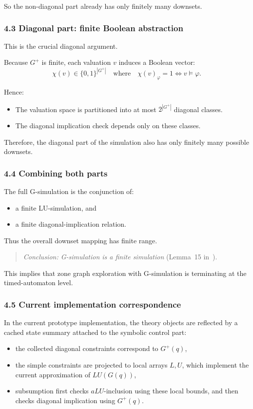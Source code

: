 \documentclass{article}
\begin{document}
So the non-diagonal part already has only finitely many downsets.

\subsubsection*{4.3 Diagonal part: finite Boolean abstraction}

This is the crucial diagonal argument.

Because $G^+$ is finite, each valuation $v$ induces a Boolean vector:
\[
\chi(v) \in \{0,1\}^{|G^+|}
\quad\text{where}\quad
\chi(v)_\varphi = 1 \iff v\models\varphi.
\]

Hence:
\begin{itemize}
  \item The valuation space is partitioned into at most
        $2^{|G^+|}$ diagonal classes.
  \item The diagonal implication check depends only on these classes.
\end{itemize}

Therefore, the diagonal part of the simulation also has
only finitely many possible downsets.

\subsubsection*{4.4 Combining both parts}

The full G-simulation is the conjunction of:
\begin{itemize}
  \item a finite LU-simulation, and
  \item a finite diagonal-implication relation.
\end{itemize}

Thus the overall downset mapping has finite range.

\begin{quote}
\emph{Conclusion: G-simulation is a finite simulation}
(Lemma~15 in~\cite{GAbs}).
\end{quote}

This implies that zone graph exploration with G-simulation
is terminating at the timed-automaton level.

\subsubsection*{4.5 Current implementation correspondence}

In the current prototype implementation, the theory objects are reflected
by a cached state summary attached to the symbolic control part:
\begin{itemize}
  \item the collected diagonal constraints correspond to $G^+(q)$,
  \item the simple constraints are projected to local arrays $L,U$,
        which implement the current approximation of $LU(G(q))$,
  \item subsumption first checks $aLU$-inclusion using these local
        bounds, and then checks diagonal implication using $G^+(q)$.
\end{itemize}
\end{document}

